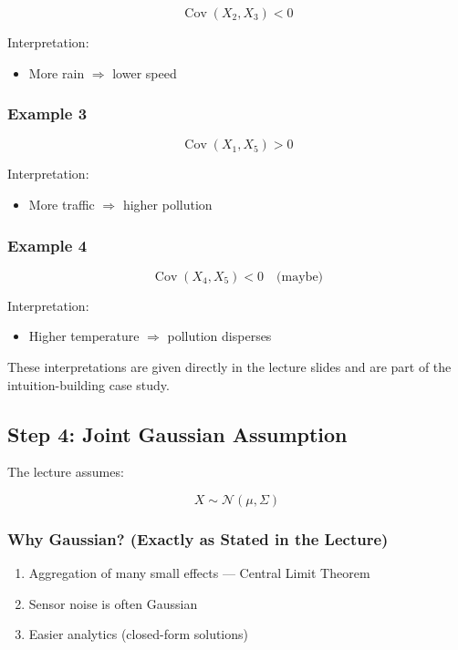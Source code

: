 \documentclass[12pt]{article}
\begin{document}
\[
\operatorname{Cov}(X_2, X_3) < 0
\]

Interpretation:

\begin{itemize}
    \item More rain \(\Rightarrow\) lower speed
\end{itemize}

\subsubsection*{Example 3}

\[
\operatorname{Cov}(X_1, X_5) > 0
\]

Interpretation:

\begin{itemize}
    \item More traffic \(\Rightarrow\) higher pollution
\end{itemize}

\subsubsection*{Example 4}

\[
\operatorname{Cov}(X_4, X_5) < 0 \quad \text{(maybe)}
\]

Interpretation:

\begin{itemize}
    \item Higher temperature \(\Rightarrow\) pollution disperses
\end{itemize}

These interpretations are given directly in the lecture slides and are part of the intuition-building case study.

\subsection{Step 4: Joint Gaussian Assumption}

The lecture assumes:

\[
X \sim \mathcal{N}(\mu, \Sigma)
\]

\subsubsection*{Why Gaussian? (Exactly as Stated in the Lecture)}

\begin{enumerate}
    \item Aggregation of many small effects --- Central Limit Theorem
    \item Sensor noise is often Gaussian
    \item Easier analytics (closed-form solutions)
\end{enumerate}
\end{document}
